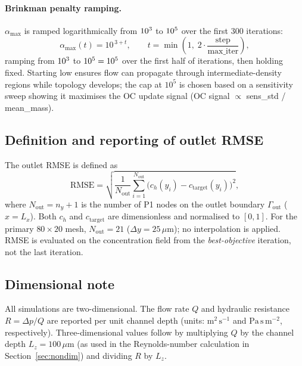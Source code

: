 \paragraph{Brinkman penalty ramping.}
$\alpha_{\max}$ is ramped logarithmically from $10^{3}$ to
$10^{5}$ over the first 300 iterations:
\begin{equation}
    \alpha_{\max}(t) = 10^{\,3 + t},
    \qquad t = \min\!\left(1,\;2\cdot\frac{\text{step}}{\text{max\_iter}}\right),
    \label{eq:alpha_cont}
\end{equation}
ramping from $10^{3}$ to $10^{5}=10^5$ over the
first half of iterations, then holding fixed.
Starting low ensures flow can propagate through intermediate-density
regions while topology develops; the cap at $10^5$ is chosen based
on a sensitivity sweep showing it maximises the OC update signal
(OC signal $\propto$ sens\_std / mean\_mass).

\subsection{Definition and reporting of outlet RMSE}
\label{sec:metrics}
The outlet RMSE is defined as
\begin{equation}
  \mathrm{RMSE}
  = \sqrt{\frac{1}{N_{\mathrm{out}}}
          \sum_{i=1}^{N_{\mathrm{out}}}
          \bigl(c_h(y_i) - c_{\mathrm{target}}(y_i)\bigr)^2},
  \label{eq:rmse}
\end{equation}
where $N_{\mathrm{out}} = n_y + 1$ is the number of P1 nodes on the
outlet boundary $\Gamma_{\mathrm{out}}$ ($x = L_x$).
Both $c_h$ and $c_{\mathrm{target}}$ are dimensionless and normalised to
$[0,1]$.
For the primary $80\times20$ mesh, $N_{\mathrm{out}} = 21$
($\Delta y = 25\,\mu$m); no interpolation is applied.
RMSE is evaluated on the concentration field from the
\emph{best-objective} iteration, not the last iteration.

\subsection{Dimensional note}
\label{sec:dimensional}
All simulations are two-dimensional.
The flow rate $Q$ and hydraulic resistance $R = \Delta p/Q$ are reported
per unit channel depth (units: $\text{m}^2\,\text{s}^{-1}$ and
$\text{Pa}\,\text{s}\,\text{m}^{-2}$, respectively).
Three-dimensional values follow by multiplying $Q$ by the channel depth
$L_z = 100\,\mu$m (as used in the Reynolds-number calculation in
Section~\ref{sec:nondim}) and dividing $R$ by $L_z$.


